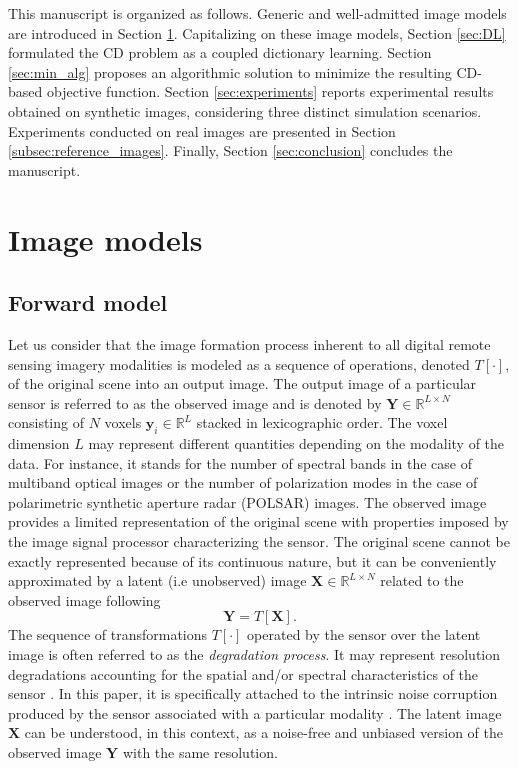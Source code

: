 \documentclass[review]{elsarticle}
\newcommand{\Ndim}{L}
\begin{document}
This manuscript is organized as follows. Generic and well-admitted image models are introduced in Section \ref{sec:models}. Capitalizing on these image models, Section \ref{sec:DL} formulated the CD problem as a coupled dictionary learning. Section \ref{sec:min_alg} proposes an algorithmic solution to minimize the resulting CD-based objective function. Section \ref{sec:experiments} reports experimental results obtained on synthetic images, considering three distinct simulation scenarios. Experiments conducted on real images are presented in Section \ref{subsec:reference_images}. Finally, Section \ref{sec:conclusion} concludes the manuscript.

\section{Image models}
\label{sec:models}

\subsection{Forward model}
\label{subsec:GFM}

Let us consider that the image formation process inherent to all digital remote sensing imagery modalities is modeled as a sequence of operations, denoted $\mathit{T}[\cdot]$, of the original scene into an output image. The output image of a particular sensor is referred to as the observed image and is denoted by $\mathbf{Y} \in \mathbb{R}^{\Ndim \times N}$
  consisting of $N$ voxels $\mathbf{y}_{i} \in \mathbb{R}^{\Ndim}$ stacked in lexicographic order. The voxel dimension $\Ndim$ may represent different quantities depending on the modality of the data. For instance, it stands for the number of spectral bands in the case of multiband optical images \citep{ferraris_robust_2017} or the number of polarization modes in the case of polarimetric synthetic aperture radar (POLSAR) images. The observed image provides a limited representation of the original scene with properties imposed by the image signal processor characterizing the sensor. The original scene cannot be exactly represented because of its continuous nature, but it can be conveniently approximated by a latent (i.e unobserved) image $\mathbf{X} \in \mathbb{R}^{\Ndim \times N}$ related to the observed image following
\begin{equation}
\label{eq:sensortransf}
	\mathbf{Y} = \mathit{T}[\mathbf{X}].
\end{equation}
The sequence of transformations $\mathit{T}[\cdot]$ operated by the sensor over the latent image is often referred to as the \emph{degradation process}. It may represent resolution degradations accounting for the spatial and/or spectral characteristics of the sensor \citep{ferraris_detecting_2017,ferraris_robust_2017}. In this paper, it is specifically attached to the intrinsic noise corruption produced by the sensor associated with a particular modality \citep{sun_alternating_2014}. The latent image $\mathbf{X}$ can be understood, in this context, as a noise-free and unbiased version of the observed image $\mathbf{Y}$ with the same resolution.
\end{document}
